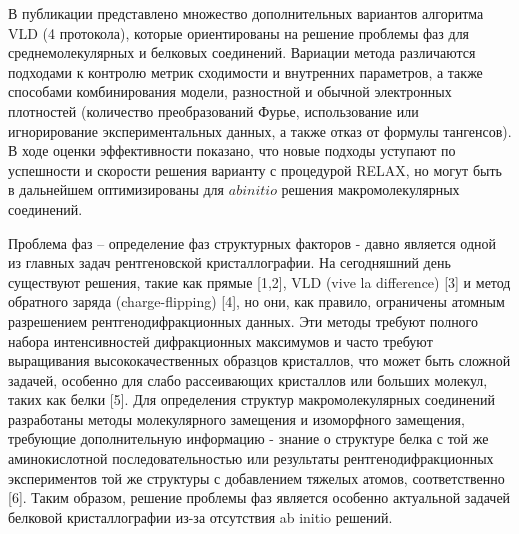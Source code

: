 В публикации \cite{burla_phasing_2011} представлено множество дополнительных вариантов алгоритма VLD (4 протокола), которые ориентированы на решение проблемы фаз для среднемолекулярных и белковых соединений. Вариации метода различаются подходами к контролю метрик сходимости и внутренних параметров, а также способами комбинирования модели, разностной и обычной электронных плотностей (количество преобразований Фурье, использование или игнорирование экспериментальных данных, а также отказ от формулы тангенсов). В ходе оценки эффективности показано, что новые подходы уступают по успешности и скорости решения варианту с процедурой RELAX, но могут быть в дальнейшем оптимизированы для $ab initio$ решения макромолекулярных соединений.





Проблема фаз – определение фаз структурных факторов - давно является одной из главных задач рентгеновской кристаллографии. На сегодняшний день существуют решения, такие как прямые [1,2], VLD (vive la difference) [3] и метод обратного заряда (charge-flipping) [4], но они, как правило, ограничены атомным разрешением рентгенодифракционных данных. Эти методы требуют полного набора интенсивностей дифракционных максимумов и часто требуют выращивания высококачественных образцов кристаллов, что может быть сложной задачей, особенно для слабо рассеивающих кристаллов или больших молекул, таких как белки [5]. Для определения структур макромолекулярных соединений разработаны методы молекулярного замещения и изоморфного замещения, требующие дополнительную информацию - знание о структуре белка с той же аминокислотной последовательностью или результаты рентгенодифракционных экспериментов той же структуры с добавлением тяжелых атомов, соответственно [6]. Таким образом, решение проблемы фаз является особенно актуальной задачей белковой кристаллографии из-за отсутствия ab initio решений. 

